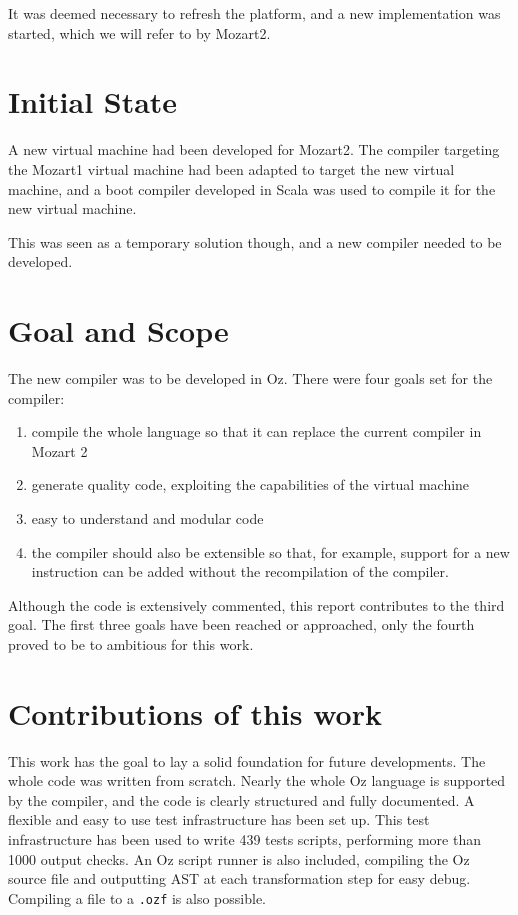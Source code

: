 \documentclass[a4paper]{memoir}
\begin{document}
It was deemed necessary to refresh the platform, and a new implementation was started, which we will refer to by Mozart2.



\section{Initial State}
A new virtual machine had been developed for Mozart2. The compiler
targeting the Mozart1 virtual machine had been adapted to target the new
virtual machine, and a boot compiler developed in Scala was used to compile it
for the new virtual machine.

This was seen as a temporary solution though, and a new compiler needed
to be developed. 


\section{Goal and Scope}
The new compiler was to be developed in Oz.
There were four goals set for the compiler:
\begin{enumerate}
  \item compile the whole language so that it can replace the current compiler in Mozart 2
  \item generate quality code, exploiting the capabilities of the virtual machine
  \item easy to understand and modular code
  \item the compiler should also be extensible so that, for example, support for a new instruction can be added without the recompilation of the compiler.
\end{enumerate}
Although the code is extensively commented, this report contributes to the third goal.
The first three goals have been reached or approached, only the fourth proved to be to ambitious for this work.

\section{Contributions of this work}
This work has the goal to lay a solid foundation for future developments. The whole code was written from scratch.
Nearly the whole Oz language is supported by the compiler, and the code is clearly structured and fully documented.
A flexible and easy to use test infrastructure has been set up. This test infrastructure has been used
to write 439 tests scripts, performing more than 1000 output checks.
An Oz script runner is also included, compiling the Oz source file and outputting AST at each transformation step for easy debug.
Compiling a file to a \lstinline!.ozf! is also possible.
\end{document}
